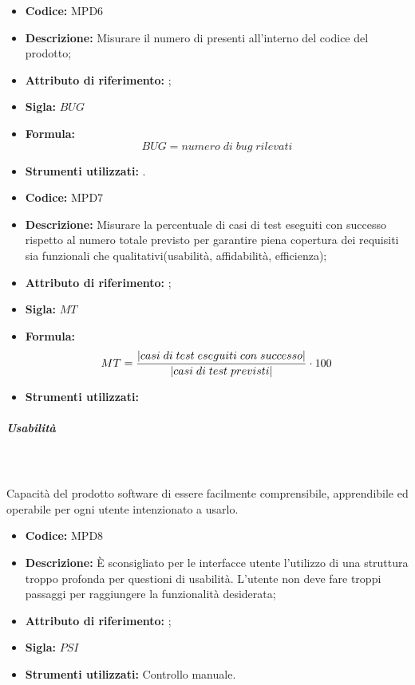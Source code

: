 \begin{itemize}
    \item \textbf{Codice:} MPD6
    \item \textbf{Descrizione:} Misurare il numero di  presenti all'interno del codice del prodotto;
    \item \textbf{Attributo di riferimento:} ;
    \item \textbf{Sigla:} $BUG$
    \item \textbf{Formula:} $$BUG = {numero \; di \; bug \; rilevati}$$
    \item \textbf{Strumenti utilizzati:} .
\end{itemize}

\begin{itemize}
    \item \textbf{Codice:} MPD7
    \item \textbf{Descrizione:} Misurare la percentuale di casi di test eseguiti con successo rispetto al numero totale previsto per garantire piena copertura dei requisiti sia funzionali che qualitativi(usabilità, affidabilità, efficienza);
    \item \textbf{Attributo di riferimento:} ;
    \item \textbf{Sigla:} $MT$
    \item \textbf{Formula:} $$MT = {|casi \; di \; test \; eseguiti \; con \; successo| \over |casi \; di \; test \; previsti|} \cdot 100$$
    \item \textbf{Strumenti utilizzati:}
\end{itemize}
       
\subparagraph{Usabilità}\mbox{}\\ \\
Capacità del prodotto software di essere facilmente comprensibile, apprendibile ed operabile per ogni utente intenzionato a usarlo.

\begin{itemize}
    \item \textbf{Codice:} MPD8
    \item \textbf{Descrizione:} È sconsigliato per le interfacce utente l'utilizzo di una struttura troppo profonda per questioni di usabilità. L'utente non deve fare troppi passaggi per raggiungere la funzionalità desiderata;
    \item \textbf{Attributo di riferimento:} ;
    \item \textbf{Sigla:} $PSI$
    \item \textbf{Strumenti utilizzati:} Controllo manuale.
\end{itemize}

